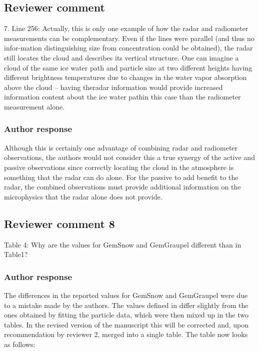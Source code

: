 \documentclass[11pt]{scrartcl}
\begin{document}
\subsection{Reviewer comment}
7.  Line 256:  Actually, this is only one example of how the radar and radiometer measurements can be complementary.  Even if the lines were parallel (and thus no infor-mation distinguishing size from concentration could be obtained), the radar still locates the cloud and describes its vertical structure.  One can imagine a cloud of the same ice water path and particle size at two different heights having different brightness temperatures due to changes in the water vapor absorption above the cloud – having theradar information would provide increased information content about the ice water pathin this case than the radiometer measurement alone.

\subsubsection*{Author response}
Although this is certainly one advantage of combining radar and radiometer
observations, the authors would not consider this a true synergy of the active
and passive observations since correctly locating the cloud in the atmosphere is
something that the radar can do alone. For the passive to add benefit to the
radar, the combined observations must provide additional information on the
microphysics that the radar alone does not provide.


\subsection*{Reviewer comment 8}
Table 4: Why are the values for GemSnow and GemGraupel different than in Table1?

\subsubsection*{Author response}

The differences in the reported values for GemSnow and GemGraupel were due to a mistake
made by the authors. The values defined in \citet{milbrandtyau05} differ slightly from
the ones obtained by fitting the particle data, which were then mixed up in the two tables.
In the revised version of the manuscript this will be corrected and, upon recommendation
by reviewer 2, merged into a single table. The table now looks as follows:
\end{document}
